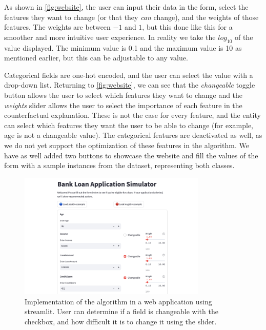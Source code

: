 \documentclass[12pt]{extarticle}
\numberwithin{equation}{section}
\begin{document}
As shown in \autoref{fig:website}, the user can input their data in the form, select the features they want to change (or that they \emph{can} change), and the weights of those features. The weights are between $-1$ and $1$, but this done like this for a smoother and more intuitive user experience. In reality we take the $log_{10}$ of the value displayed. The minimum value is 0.1 and the maximum value is 10 as mentioned earlier, but this can be adjustable to any value. 

Categorical fields are one-hot encoded, and the user can select the value with a drop-down list. Returning to \autoref{fig:website}, we can see that the \emph{changeable} toggle button allows the user to select which features they want to change and the \emph{weights} slider allows the user to select the importance of each feature in the counterfactual explanation. These is not the case for every feature, and the entity can select which features they want the user to be able to change (for example, age is not a changeable value). The categorical features are deactivated as well, as we do not yet support the optimization of these features in the algorithm. We have as well added two buttons to showcase the website and fill the values of the form with a sample instances from the dataset, representing both classes.

\begin{figure}[H]
    \centering
    \includegraphics[width=0.8\textwidth]{images/website}
    \caption{Implementation of the algorithm in a web application using streamlit. User can determine if a field is changeable with the checkbox, and how difficult it is to change it using the slider.}
    \label{fig:website}
\end{figure}
\end{document}
